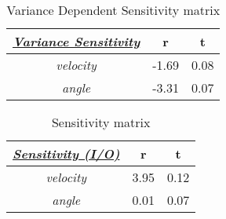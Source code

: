 \begin{table}[h!]
\centering
\caption{Variance Dependent Sensitivity matrix}
\label{VarDepSensitivityComputed}
\begin{tabular}{|c|c|c|}
\hline
{\ul \textit{\textbf{Variance Sensitivity}}} & \textbf{r} & \textbf{t} \\ \hline
\textit{velocity}                     & -1.69   & 0.08   \\ \hline
\textit{angle}                        & -3.31   & 0.07   \\ \hline
\end{tabular}
\end{table}
\begin{table}[h!]
\centering
\caption{Sensitivity matrix}
\label{SensitivityComputed}
\begin{tabular}{|c|c|c|}
\hline
{\ul \textit{\textbf{Sensitivity (I/O)}}} & \textbf{r} & \textbf{t} \\ \hline
\textit{velocity}                     & 3.95   & 0.12   \\ \hline
\textit{angle}                        & 0.01   & 0.07   \\ \hline
\end{tabular}
\end{table}


